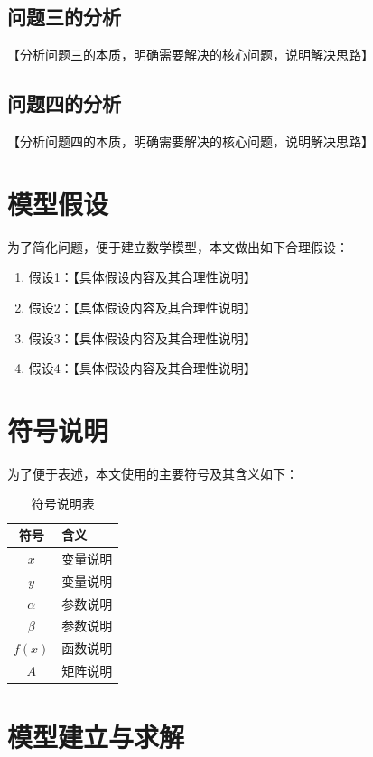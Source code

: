 \documentclass[12pt,a4paper]{ctexart}
\begin{document}
\subsection{问题三的分析}
【分析问题三的本质，明确需要解决的核心问题，说明解决思路】

\subsection{问题四的分析}
【分析问题四的本质，明确需要解决的核心问题，说明解决思路】

\section{模型假设}

为了简化问题，便于建立数学模型，本文做出如下合理假设：

\begin{enumerate}
    \item 假设1：【具体假设内容及其合理性说明】
    \item 假设2：【具体假设内容及其合理性说明】
    \item 假设3：【具体假设内容及其合理性说明】
    \item 假设4：【具体假设内容及其合理性说明】
\end{enumerate}

\section{符号说明}

为了便于表述，本文使用的主要符号及其含义如下：

\begin{table}[H]
\centering
\begin{tabular}{cl}
\toprule
\textbf{符号} & \textbf{含义} \\
\midrule
$x$ & 变量说明 \\
$y$ & 变量说明 \\
$\alpha$ & 参数说明 \\
$\beta$ & 参数说明 \\
$f(x)$ & 函数说明 \\
$A$ & 矩阵说明 \\
\bottomrule
\end{tabular}
\caption{符号说明表}
\end{table}

\section{模型建立与求解}
\end{document}
